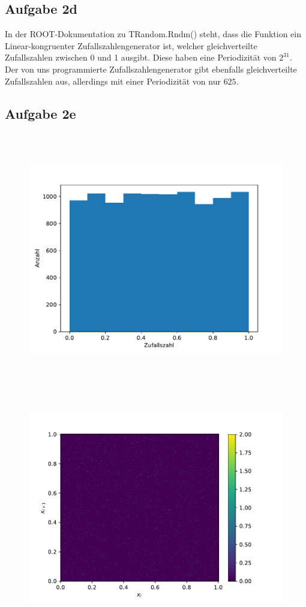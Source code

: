 \subsection*{Aufgabe 2d}
In der ROOT-Dokumentation zu TRandom.Rndm() steht, dass die Funktion ein Linear-kongruenter Zufallszahlengenerator ist, welcher gleichverteilte Zufallszahlen zwischen 0 und 1 ausgibt. Diese haben eine Periodizität von $2^{31}$. \\
Der von uns programmierte Zufallszahlengenerator gibt ebenfalls gleichverteilte Zufallszahlen aus, allerdings mit einer Periodizität von nur $625$.

\subsection*{Aufgabe 2e}
\begin{figure}[H]
  \includegraphics[height=11cm]{Python/Aufgabe2e1.pdf}
\end{figure}
\begin{figure}[H]
  \includegraphics[height=10cm]{Python/Aufgabe2e2.pdf}
\end{figure}
